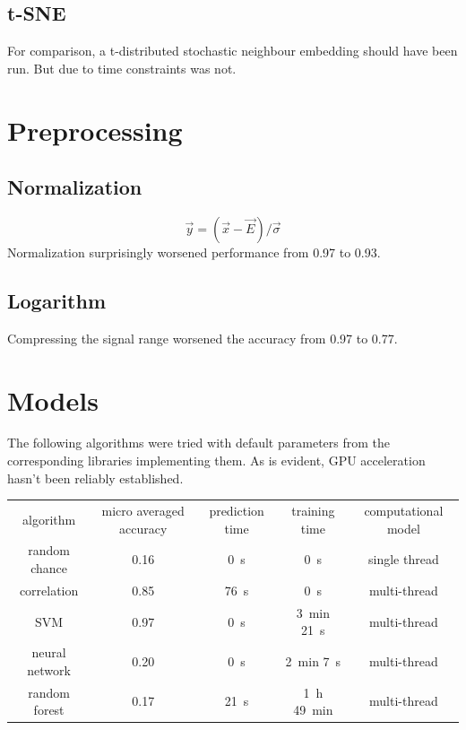 \documentclass{article}
\begin{document}
\subsection{t-SNE}
For comparison, a t-distributed stochastic neighbour embedding should have been run.
But due to time constraints was not.


\section{Preprocessing}
\subsection{Normalization}
$$ \vec{y} = (\vec{x} - \vec{E}) / \vec{\sigma} $$
Normalization surprisingly worsened performance from 0.97 to 0.93.


\subsection{Logarithm}
Compressing the signal range worsened the accuracy from 0.97 to 0.77.


\section{Models}
The following algorithms were tried with default parameters from the corresponding libraries implementing them.
As is evident, GPU acceleration hasn't been reliably established.
\\ \par
{}
\begin{tabular}{ c | c | c | c | c }
algorithm      & micro averaged accuracy & prediction time  & training time                    & computational model \\
random chance  & 0.16                    & \SI{0}{\second}  & \SI{0}{\second}                  & single thread \\
correlation    & 0.85                    & \SI{76}{\second} & \SI{0}{\second}                  & multi-thread \\
SVM            & 0.97                    & \SI{0}{\second}  & \SI{3}{\minute} \SI{21}{\second} & multi-thread \\
neural network & 0.20                    & \SI{0}{\second}  & \SI{2}{\minute} \SI{7}{\second}  & multi-thread \\
random forest  & 0.17                    & \SI{21}{\second} & \SI{1}{\hour} \SI{49}{\minute}   & multi-thread \\
\end{tabular}
\end{document}
